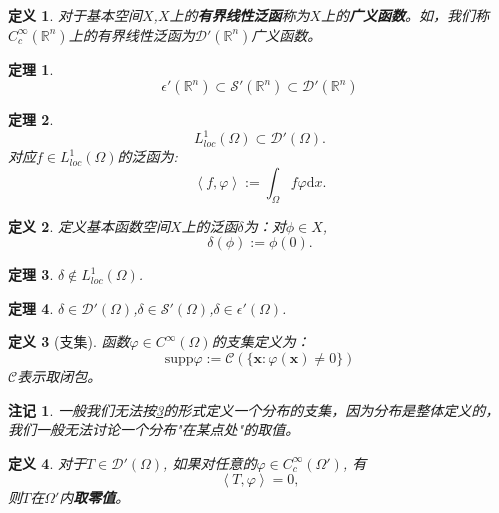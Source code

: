 \documentclass[a4paper]{ctexart}
\newtheorem{Definition}{\hspace{2em}定义}[section]
\newtheorem{Thm}{\hspace{2em}定理}[section]
\newtheorem{rem}{\hspace{2em}注记}[section]
\newcommand{\supp}{\text{supp}}
\newcommand{\dif}{\mathrm{d}}
\newcommand{\innerprod}[2]{\left<#1,#2\right>}
\begin{document}
\begin{Definition}
    对于基本空间$X$,$X$上的\textbf{有界线性泛函}称为$X$上的\textbf{广义函数}。如，我们称$C_{c}^{\infty}(\mathbb{R}^{n})$上的有界线性泛函为$\mathcal{D}'(\mathbb{R}^{n})$广义函数。
\end{Definition}
\begin{Thm}
    \begin{equation}
        \mathcal{\epsilon}'(\mathbb{R}^{n})\subset\mathscr{S}'(\mathbb{R}^{n})\subset\mathcal{D}'(\mathbb{R}^{n})
    \end{equation}
\end{Thm}
\begin{Thm}
    \begin{equation}
    L_{loc}^{1}(\Omega)\subset\mathcal{D}'(\Omega).
    \end{equation}
    对应$f\in L_{loc}^{1}(\Omega)$的泛函为:
    \begin{equation}
        \innerprod{f}{\varphi}:=\int_{\Omega}f\varphi\dif x.
    \end{equation}
\end{Thm}
\begin{Definition}
    定义基本函数空间$X$上的泛函$\delta$为：对$\phi\in X$,
    \begin{equation}
        \delta(\phi):=\phi(0).
    \end{equation}
\end{Definition}
\begin{Thm}
    $\delta\notin L_{loc}^{1}(\Omega)$.
\end{Thm}
\begin{Thm}
    $\delta\in\mathcal{D}'(\Omega)$,$\delta\in\mathscr{S}'(\Omega)$,$\delta\in\epsilon'(\Omega)$.
\end{Thm}
\begin{Definition}[支集]
    \label{support}
    函数$\varphi\in C^{\infty}(\Omega)$的支集定义为：
    \begin{equation}
        \supp\varphi:=\mathcal{C}(\{\mathbf{x}:\varphi(\mathbf{x})\neq 0\})
    \end{equation}
    $\mathcal{C}$表示取闭包。
\end{Definition}
\begin{rem}
    一般我们无法按\ref{support}的形式定义一个分布的支集，因为分布是整体定义的，我们一般无法讨论一个分布"在某点处"的取值。
\end{rem}
\begin{Definition}
    对于$T\in\mathcal{D}'(\Omega)$, 如果对任意的$\varphi\in C_{c}^{\infty}(\Omega')$, 有
    \begin{equation}
        \innerprod{T}{\varphi}=0,
    \end{equation}
    则$T$在$\Omega'$内\textbf{取零值}。
\end{Definition}
\end{document}
